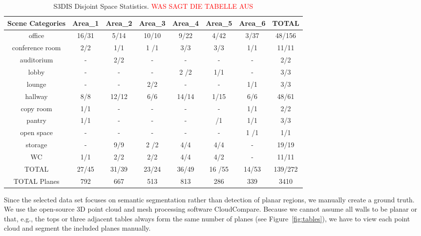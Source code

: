 \documentclass[main.tex]{subfiles}
\begin{document}
\begin{table}[H]
    \centering
    \begin{tabular}{c|c|c|c|c|c|c|c}
        \hline
        Scene Categories & Area\_1 & Area\_2 & Area\_3 & Area\_4 & Area\_5 & Area\_6 & TOTAL   \\ \hline
        office           & 16/31   & 5/14    & 10/10   & 9/22    & 4/42    & 3/37    & 48/156  \\ \hline
        conference room  & 2/2     & 1/1     & 1 /1    & 3/3     & 3/3     & 1/1     & 11/11   \\ \hline
        auditorium       & -       & 2/2     & -       & -       & -       & -       & 2/2     \\ \hline
        lobby            & -       & -       & -       & 2 /2    & 1/1     & -       & 3/3     \\ \hline
        lounge           & -       & -       & 2/2     & -       & -       & 1/1     & 3/3     \\ \hline
        hallway          & 8/8     & 12/12   & 6/6     & 14/14   & 1/15    & 6/6     & 48/61   \\ \hline
        copy room        & 1/1     & -       & -       & -       & -       & 1/1     & 2/2     \\ \hline
        pantry           & 1/1     & -       & -       & -       & /1      & 1/1     & 3/3     \\ \hline
        open space       & -       & -       & -       & -       & -       & 1 /1    & 1/1     \\ \hline
        storage          & -       & 9/9     & 2 /2    & 4/4     & 4/4     & -       & 19/19   \\ \hline
        WC               & 1/1     & 2/2     & 2/2     & 4/4     & 4/2     & -       & 11/11   \\ \hline
        TOTAL            & 27/45   & 31/39   & 23/24   & 36/49   & 16 /55  & 14/53   & 139/272 \\ \hline
        TOTAL Planes     & 792     & 667     & 513     & 813     & 286     & 339     & 3410    \\
    \end{tabular}
    \caption{S3DIS Disjoint Space Statistics. \textcolor{red}{WAS SAGT DIE TABELLE AUS}}
    \label{tab:stanfordStats}
\end{table}

Since the selected data set focuses on semantic segmentation rather than detection of planar regions, we manually create a ground truth.
We use the open-source 3D point cloud and mesh processing software CloudCompare.
Because we cannot assume all walls to be planar or that, e.g., the tops or three adjacent tables always form the same number of planes (see Figure~\ref{fig:tables}), we 
have to view each point cloud and segment the included planes manually.
\end{document}
